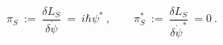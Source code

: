 \begin{equation}
\pi _{S}\ :=\ {\frac{\delta L_{S}}{\delta \dot{\psi}}}\ =\ i\hbar \psi
^{\ast }\ ,\qquad \pi _{S}^{\ast }\ :=\ {\frac{\delta L_{S}}{\delta \dot{\psi%
}^{\ast }}}\ =0\ .  \label{momentaSchiff}
\end{equation}%
